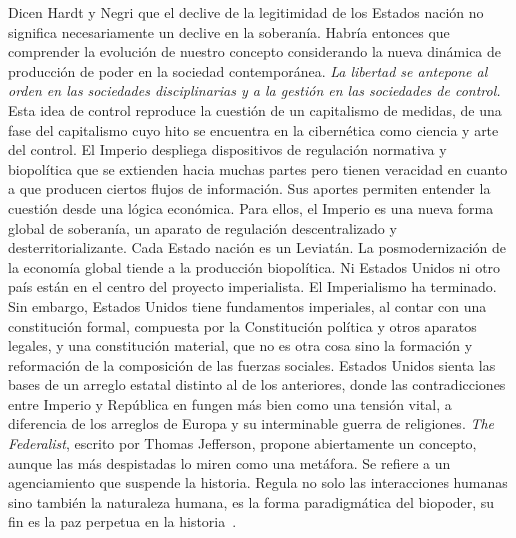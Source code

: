 Dicen Hardt y Negri que el declive de la legitimidad de los Estados nación no significa necesariamente un declive en la soberanía. Habría entonces que comprender la evolución de nuestro concepto considerando la nueva dinámica de producción de poder en la sociedad contemporánea. \emph{La libertad se antepone al orden en las sociedades disciplinarias y a la gestión en las sociedades de control.} Esta idea de control reproduce la cuestión de un capitalismo de medidas, de una fase del capitalismo cuyo hito se encuentra en la cibernética como ciencia y arte del control. El Imperio despliega dispositivos de regulación normativa y biopolítica que se extienden hacia muchas partes pero tienen veracidad en cuanto a que producen ciertos flujos de información. Sus aportes permiten entender la cuestión desde una lógica económica. Para ellos, el Imperio es una nueva forma global de soberanía, un aparato de regulación descentralizado y desterritorializante. Cada Estado nación es un Leviatán. La posmodernización de la economía global tiende a la producción biopolítica. Ni Estados Unidos ni otro país están en el centro del proyecto imperialista. El Imperialismo ha terminado. Sin embargo, Estados Unidos tiene fundamentos imperiales, al contar con una constitución formal, compuesta por la Constitución política y otros aparatos legales, y una constitución material, que no es otra cosa sino la formación y reformación de la composición de las fuerzas sociales. Estados Unidos sienta las bases de un arreglo estatal distinto al de los anteriores, donde las contradicciones entre Imperio y República en \autocite[Tratado de Nomadología]{deleuzeMilMesetasCapitalismo2002} fungen más bien como una tensión vital, a diferencia de los arreglos de Europa y su interminable guerra de religiones. \emph{The Federalist}, escrito por Thomas Jefferson, propone abiertamente un concepto, aunque las más despistadas lo miren como una metáfora. Se refiere a un agenciamiento que suspende la historia. Regula no solo las interacciones humanas sino también la naturaleza humana, es la forma paradigmática del biopoder, su fin es la paz perpetua en la historia~\autocite{hardtImperio2005}.

